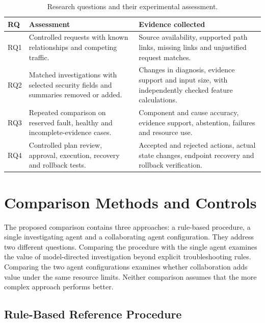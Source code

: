 \begin{table}[htbp]
\centering\small
\caption{Research questions and their experimental assessment.}
\label{tab:methodology:rq}
\begin{tabularx}{\textwidth}{@{}>{\raggedright\arraybackslash}p{}>{\raggedright\arraybackslash}X>{\raggedright\arraybackslash}X@{}}
\toprule
RQ & Assessment & Evidence collected \\
\midrule
RQ1 & Controlled requests with known relationships and competing traffic. & Source availability, supported path links, missing links and unjustified request matches. \\
\addlinespace
RQ2 & Matched investigations with selected security fields and summaries removed or added. & Changes in diagnosis, evidence support and input size, with independently checked feature calculations. \\
\addlinespace
RQ3 & Repeated comparison on reserved fault, healthy and incomplete-evidence cases. & Component and cause accuracy, evidence support, abstention, failures and resource use. \\
\addlinespace
RQ4 & Controlled plan review, approval, execution, recovery and rollback tests. & Accepted and rejected actions, actual state changes, endpoint recovery and rollback verification. \\
\bottomrule
\end{tabularx}
\end{table}

\section{Comparison Methods and Controls}
\label{sec:methodology:comparison}

The proposed comparison contains three approaches: a rule-based procedure,
a single investigating agent and a collaborating agent configuration.
They address two different questions. Comparing the procedure with the
single agent examines the value of model-directed investigation beyond
explicit troubleshooting rules. Comparing the two agent configurations
examines whether collaboration adds value under the same resource limits.
Neither comparison assumes that the more complex approach performs better.

\subsection{Rule-Based Reference Procedure}

